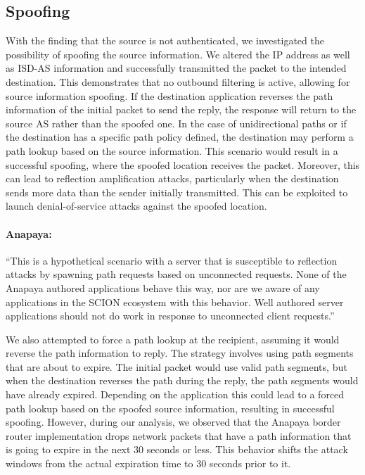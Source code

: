 \subsection{Spoofing}
\label{sec:spoofing}
With the finding that the source is not authenticated, we investigated the possibility of spoofing the source information.
We altered the IP address as well as ISD-AS information and successfully transmitted the packet to the intended destination.
This demonstrates that no outbound filtering is active, allowing for source information spoofing.
If the destination application reverses the path information of the initial packet to send the reply, the response will return to the source AS rather than the spoofed one.
In the case of unidirectional paths or if the destination has a specific path policy defined, the destination may perform a path lookup based on the source information.
This scenario would result in a successful spoofing, where the spoofed location receives the packet.
Moreover, this can lead to reflection amplification attacks, particularly when the destination sends more data than the sender initially transmitted.
This can be exploited to launch denial-of-service attacks against the spoofed location.

\begin{boxH}
\paragraph{Anapaya:}
``This is a hypothetical scenario with a server that is susceptible to reflection attacks by spawning path requests based on unconnected requests. None of the Anapaya authored applications behave this way, nor are we aware of any applications in the SCION ecosystem with this behavior. Well authored server applications should not do work in response to unconnected client requests.''
\end{boxH}

We also attempted to force a path lookup at the recipient, assuming it would reverse the path information to reply.
The strategy involves using path segments that are about to expire.
The initial packet would use valid path segments, but when the destination reverses the path during the reply, the path segments would have already expired.
Depending on the application this could lead to a forced path lookup based on the spoofed source information, resulting in successful spoofing.
However, during our analysis, we observed that the Anapaya border router implementation drops network packets that have a path information that is going to expire in the next 30 seconds or less.
This behavior shifts the attack windows from the actual expiration time to 30 seconds prior to it.


